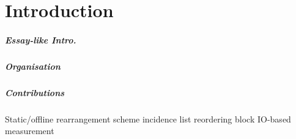 \chapter{Introduction}\label{\positionnumber}  
\paragraph{Essay-like Intro.}

\paragraph{Organisation} 

\paragraph{Contributions}
Static/offline rearrangement scheme
incidence list reordering
block IO-based measurement
